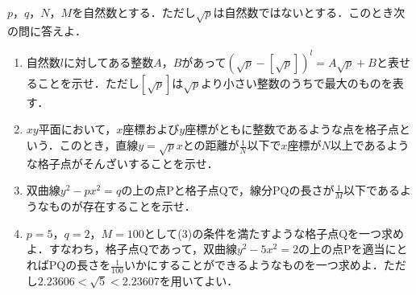 $p$，$q$，$N$，$M$を自然数とする．ただし$\sqrt{p}$は自然数ではないとする．このとき次の問に答えよ．
\begin{enumerate}
  \item 自然数$l$に対してある整数$A$，$B$があって$(\sqrt{p}-[\sqrt{p}])^l=A\sqrt{p}+B$と表せることを示せ．ただし$[\sqrt{p}] $は$\sqrt{p}$より小さい整数のうちで最大のものを表す．
  \item $xy$平面において，$x$座標および$y$座標がともに整数であるような点を格子点という．このとき，直線$y=\sqrt{p}x$との距離が$\frac{1}{N}$以下で$x$座標が$N$以上であるような格子点がそんざいすることを示せ．
  \item 双曲線$y^2-px^2=q$の上の点$\mathrm{P}$と格子点$\mathrm{Q}$で，線分$\mathrm{PQ}$の長さが$\frac{1}{M}$以下であるようなものが存在することを示せ．
  \item $p=5$，$q=2$，$M=100$として(3)の条件を満たすような格子点$\mathrm{Q}$を一つ求めよ．すなわち，格子点$\mathrm{Q}$であって，双曲線$y^2-5x^2=2$の上の点$\mathrm{P}$を適当にとれば$\mathrm{PQ}$の長さを$\frac{1}{100}$いかにすることができるようなものを一つ求めよ．ただし$2.23606<\sqrt{5}<2.23607$を用いてよい．
\end{enumerate}
